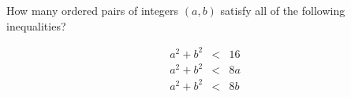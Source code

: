 How many ordered pairs of integers $(a,b)$ satisfy all of the following inequalities?

\begin{eqnarray*} a^2 + b^2 &<& 16 \\ a^2 + b^2 &<& 8a \\ a^2 + b^2 &<& 8b \end{eqnarray*}